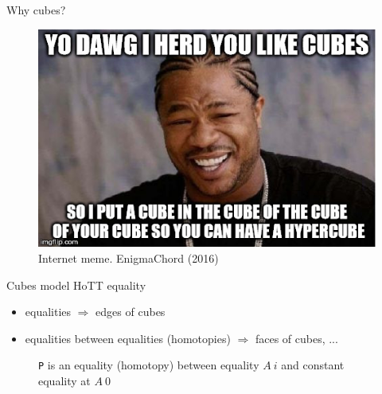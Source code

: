 \documentclass[english]{beamer}
\begin{document}
\begin{frame}{Why cubes?}

\begin{figure}[h!]
    \includegraphics[width=.8\textwidth]{figures/cube-joke.jpg}
    \caption{Internet meme. EnigmaChord (2016)}
\end{figure}
\end{frame}


\begin{frame}{Cubes model HoTT equality}
 
\begin{itemize}
 \item equalities $\Rightarrow$ edges of cubes
 \item equalities between equalities (homotopies) $\Rightarrow$ faces of cubes, ...
\end{itemize}

\begin{figure}
 
 \caption{ \texttt{P} is an equality (homotopy) between equality $A\ i$ and constant equality at $A \ 0$}
\end{figure}
\end{frame}
\end{document}

